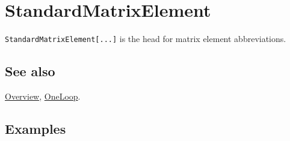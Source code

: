 \documentclass[../FeynCalcManual.tex]{subfiles}
\begin{document}
\hypertarget{standardmatrixelement}{
\section{StandardMatrixElement}\label{standardmatrixelement}}

\texttt{StandardMatrixElement[\allowbreak{}...]} is the head for matrix
element abbreviations.

\subsection{See also}

\hyperlink{toc}{Overview}, \hyperlink{oneloop}{OneLoop}.

\subsection{Examples}
\end{document}
